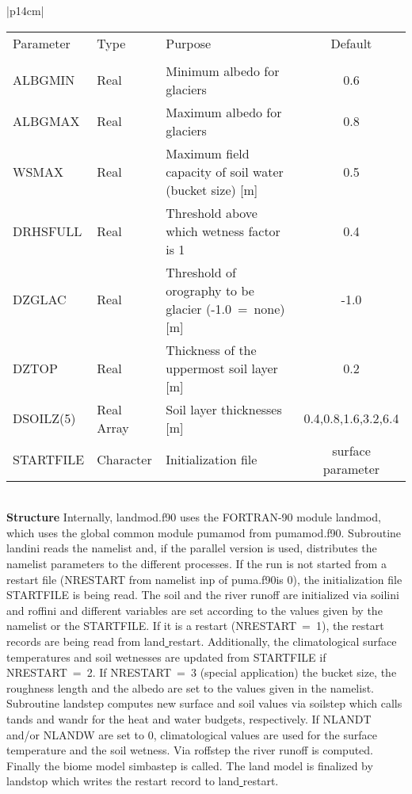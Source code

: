\begin{center}
\begin{tabular}{|p{14cm}|}
\begin{center}
\begin{tabular}{l l p{5cm} c} %
Parameter & Type & Purpose & Default \\
&&&\\
ALBGMIN & Real& Minimum albedo for glaciers & 0.6 \\
ALBGMAX & Real& Maximum albedo for glaciers & 0.8 \\
WSMAX & Real&  Maximum field capacity of soil water (bucket size) [m] & 0.5 \\
DRHSFULL & Real&  Threshold above which wetness factor is 1 & 0.4 \\
DZGLAC &Real&  Threshold of orography to be glacier (-1.0~=~none) [m] & -1.0 \\
DZTOP &Real& Thickness of the uppermost soil layer [m] & 0.2 \\
DSOILZ(5) & Real Array & Soil layer thicknesses [m] & 0.4,0.8,1.6,3.2,6.4\\
STARTFILE & Character & Initialization file & surface\underline{ }parameter \\  
\end{tabular}
\end{center}
\vspace{3mm} \\
\hline
\vspace{2mm} {\bf Structure} Internally, {\module landmod.f90} uses the FORTRAN-90
module {\modu landmod}, which uses the global common module {\modu pumamod} from
{\module pumamod.f90}. Subroutine {\sub landini} reads the namelist and, if the parallel
version is used,  distributes the namelist parameters to the different processes. If the run is not
started from a restart file (NRESTART from namelist {\nam inp} of {\module puma.f90}is
0), the initialization file
{\file STARTFILE} is being read. The soil and the river runoff are initialized via {\sub
soilini}
and {\sub roffini} and different variables are set according to the values given by the namelist
or
the {\file STARTFILE}. If it is a restart  (NRESTART~=~1), the restart records are being
read
from {\file land\underline{ }restart}. Additionally, the climatological surface temperatures
and
soil
wetnesses are updated from {\file STARTFILE} if NRESTART~=~2. If NRESTART~=~3
(special application) the bucket size, the roughness length and the albedo are set to the values
given in the namelist.  Subroutine {\sub landstep} computes new surface and soil values via
{\sub soilstep} which calls {\sub tands} and {\sub wandr} for the heat and water budgets,
respectively. If NLANDT and/or NLANDW are set to 0, climatological values are used for
the
surface temperature and the soil wetness. Via {\sub roffstep} the river runoff is computed.
Finally
the biome model {\sub simbastep} is called. The land model is finalized by {\sub landstop}
which writes the restart record to {\file land\underline{ }restart}. \vspace{3mm} \\
\hline
\end{tabular}
\end{center}
